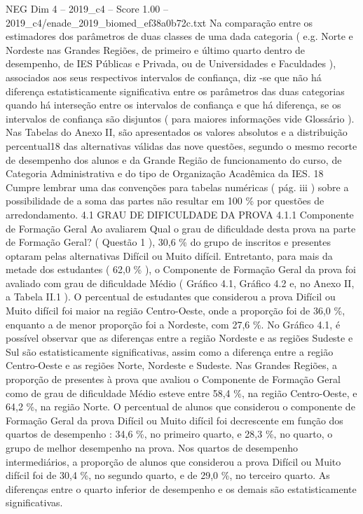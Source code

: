 \begin{textsample}{NEG Dim 4 – 2019\_c4 – Score 1.00 – 2019\_c4/enade\_2019\_biomed\_ef38a0b72c.txt}
Na comparação entre os estimadores dos parâmetros de duas classes de uma dada categoria ( e.g.
Norte e Nordeste nas Grandes Regiões, de primeiro e último quarto dentro de desempenho, de IES Públicas e Privada, ou de Universidades e Faculdades ), associados aos seus respectivos intervalos de confiança, diz -se que não há diferença estatisticamente significativa entre os parâmetros das duas categorias quando há interseção entre os intervalos de confiança e que há diferença, se os intervalos de confiança são disjuntos ( para maiores informações vide Glossário ).
Nas Tabelas do Anexo II, são apresentados os valores absolutos e a distribuição percentual18 das alternativas válidas das nove questões, segundo o mesmo recorte de desempenho dos alunos e da Grande Região de funcionamento do curso, de Categoria Administrativa e do tipo de Organização Acadêmica da IES. 18 Cumpre lembrar uma das convenções para tabelas numéricas ( pág. iii ) sobre a possibilidade de a soma das partes não resultar em 100 \% por questões de arredondamento. 4.1 GRAU DE DIFICULDADE DA PROVA 4.1.1 Componente de Formação Geral Ao avaliarem Qual o grau de dificuldade desta prova na parte de Formação Geral? ( Questão 1 ), 30,6 \% do grupo de inscritos e presentes optaram pelas alternativas Difícil ou Muito difícil.
Entretanto, para mais da metade dos estudantes ( 62,0 \% ), o Componente de Formação Geral da prova foi avaliado com grau de dificuldade Médio ( Gráfico 4.1, Gráfico 4.2 e, no Anexo II, a Tabela II.1 ).
O percentual de estudantes que considerou a prova Difícil ou Muito difícil foi maior na região Centro-Oeste, onde a proporção foi de 36,0 \%, enquanto a de menor proporção foi a Nordeste, com 27,6 \%.
No Gráfico 4.1, é possível observar que as diferenças entre a região Nordeste e as regiões Sudeste e Sul são estatisticamente significativas, assim como a diferença entre a região Centro-Oeste e as regiões Norte, Nordeste e Sudeste.
Nas Grandes Regiões, a proporção de presentes à prova que avaliou o Componente de Formação Geral como de grau de dificuldade Médio esteve entre 58,4 \%, na região Centro-Oeste, e 64,2 \%, na região Norte.
O percentual de alunos que considerou o componente de Formação Geral da prova Difícil ou Muito difícil foi decrescente em função dos quartos de desempenho : 34,6 \%, no primeiro quarto, e 28,3 \%, no quarto, o grupo de melhor desempenho na prova.
Nos quartos de desempenho intermediários, a proporção de alunos que considerou a prova Difícil ou Muito difícil foi de 30,4 \%, no segundo quarto, e de 29,0 \%, no terceiro quarto.
As diferenças entre o quarto inferior de desempenho e os demais são estatisticamente significativas.

\end{textsample}
